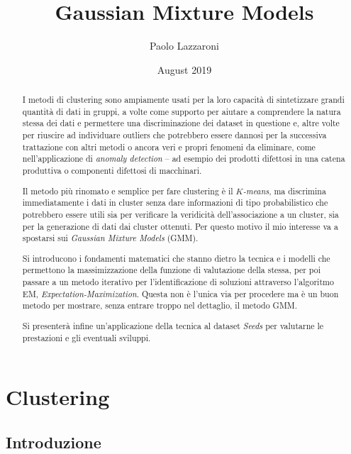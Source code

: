 \documentclass{report}
\begin{document}
\title{Gaussian Mixture Models}
\author{Paolo Lazzaroni}
\date{August 2019}
\maketitle

\tableofcontents

\begin{abstract}

I metodi di clustering sono ampiamente usati per la loro capacità di sintetizzare grandi quantità di dati in gruppi, a volte come supporto per aiutare a comprendere la natura stessa dei dati e permettere una discriminazione dei dataset in questione e, altre volte per riuscire ad individuare outliers che potrebbero essere dannosi per la successiva trattazione con altri metodi o ancora veri e propri fenomeni da eliminare, come nell'applicazione di \textit{anomaly detection} -- ad esempio dei prodotti difettosi in una catena produttiva o componenti difettosi di macchinari.

Il metodo più rinomato e semplice per fare clustering è il \textit{$K$-means}, ma discrimina immediatamente i dati in cluster senza dare informazioni di tipo probabilistico che potrebbero essere utili sia per verificare la veridicità dell'associazione a un cluster, sia per la generazione di dati dai cluster ottenuti. Per questo motivo il mio interesse va a spostarsi sui \textit{Gaussian Mixture Models} (GMM).

Si introducono i fondamenti matematici che stanno dietro la tecnica e i modelli che permettono la massimizzazione della funzione di valutazione della stessa, per poi passare a un metodo iterativo per l'identificazione di soluzioni attraverso l'algoritmo EM, \textit{Expectation-Maximization}. Questa non è l'unica via per procedere ma è un buon metodo per mostrare, senza entrare troppo nel dettaglio, il metodo GMM.

Si presenterà infine un'applicazione della tecnica al dataset \textit{Seeds} per valutarne le prestazioni e gli eventuali sviluppi.
\end{abstract}

\chapter{Clustering}
\section{Introduzione}
\end{document}
